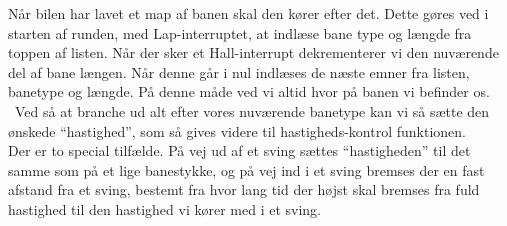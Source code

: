 Når bilen har lavet et map af banen skal den kører efter det. Dette gøres ved i starten af runden, med Lap-interruptet, at indlæse bane type og længde fra toppen af listen. Når der sker et Hall-interrupt dekrementerer vi den nuværende del af bane længen. Når denne går i nul indlæses de næste emner fra listen, banetype og længde. På denne måde ved vi altid hvor på banen vi befinder os.
\\\
Ved så at branche ud alt efter vores nuværende banetype kan vi så sætte den ønskede ``hastighed'', som så gives videre til hastigheds-kontrol funktionen.
\\
Der er to special tilfælde. På vej ud af et sving sættes ``hastigheden'' til det samme som på et lige banestykke, og på vej ind i et sving bremses der en fast afstand fra et sving, bestemt fra hvor lang tid der højst skal bremses fra fuld hastighed til den hastighed vi kører med i et sving.



















